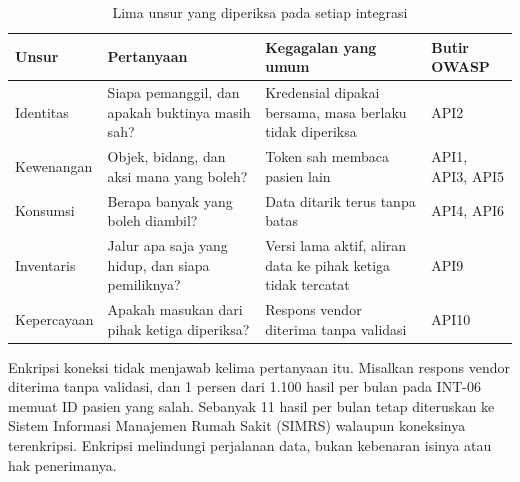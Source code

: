 \begin{table}[!htb]
  \centering
  \caption{Lima unsur yang diperiksa pada setiap integrasi}
  \label{tab:ch06-unsur}
  \small
  \begin{tabularx}{\textwidth}{T{1.9cm}QQT{1.5cm}}
    \hline
    \textbf{Unsur} & \textbf{Pertanyaan} & \textbf{Kegagalan yang umum} & \textbf{Butir OWASP} \\ \hline
    Identitas & Siapa pemanggil, dan apakah buktinya masih sah? & Kredensial dipakai bersama, masa berlaku tidak diperiksa & API2 \\ \hline
    Kewenangan & Objek, bidang, dan aksi mana yang boleh? & Token sah membaca pasien lain & API1, API3, API5 \\ \hline
    Konsumsi & Berapa banyak yang boleh diambil? & Data ditarik terus tanpa batas & API4, API6 \\ \hline
    Inventaris & Jalur apa saja yang hidup, dan siapa pemiliknya? & Versi lama aktif, aliran data ke pihak ketiga tidak tercatat & API9 \\ \hline
    Kepercayaan & Apakah masukan dari pihak ketiga diperiksa? & Respons vendor diterima tanpa validasi & API10 \\ \hline
  \end{tabularx}
\end{table}

Enkripsi koneksi tidak menjawab kelima pertanyaan itu. Misalkan respons vendor diterima tanpa validasi, dan 1 persen
dari 1.100 hasil per bulan pada INT-06 memuat ID pasien yang salah. Sebanyak 11 hasil per bulan tetap diteruskan ke
Sistem Informasi Manajemen Rumah Sakit (SIMRS) walaupun koneksinya terenkripsi. Enkripsi melindungi perjalanan data,
bukan kebenaran isinya atau hak penerimanya.

